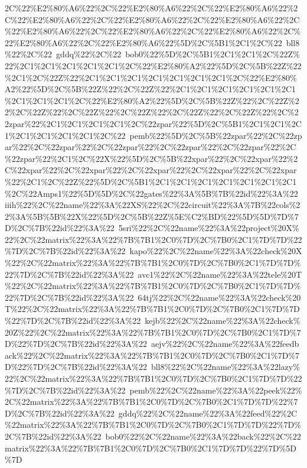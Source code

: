 \documentclass[onecolumn,unpublished,a4paper]{quantumarticle}
\theoremstyle{definition}
\begin{document}
2C\%22\%E2\%80\%A6\%22\%2C\%22\%E2\%80\%A6\%22\%2C\%22\%E2\%80\%A6\%22\%2C\%22\%E2\%80\%A6\%22\%2C\%22\%E2\%80\%A6\%22\%2C\%22\%E2\%80\%A6\%22\%2C\%22\%E2\%80\%A6\%22\%2C\%22\%E2\%80\%A6\%22\%2C\%22\%E2\%80\%A6\%22\%2C\%22\%E2\%80\%A6\%22\%2C\%22\%E2\%80\%A6\%22\%5D\%2C\%5B1\%2C1\%2C\%22~bll8\%22\%2C\%22~gddq\%22\%2C\%22~bob0\%22\%5D\%2C\%5B1\%2C1\%2C1\%2C\%22Z\%22\%2C1\%2C1\%2C1\%2C1\%2C1\%2C\%22\%E2\%80\%A2\%22\%5D\%2C\%5B\%22Z\%22\%2C1\%2C\%22Z\%22\%2C1\%2C1\%2C1\%2C1\%2C1\%2C1\%2C1\%2C\%22\%E2\%80\%A2\%22\%5D\%2C\%5B\%22Z\%22\%2C\%22Z\%22\%2C1\%2C1\%2C1\%2C1\%2C1\%2C1\%2C1\%2C1\%2C1\%2C\%22\%E2\%80\%A2\%22\%5D\%2C\%5B\%22Z\%22\%2C\%22Z\%22\%2C\%22Z\%22\%2C\%22Z\%22\%2C\%22Z\%22\%2C\%22Z\%22\%2C\%22Z\%22\%2C\%22zpar\%22\%2C1\%2C1\%2C1\%2C1\%2C\%22zpar\%22\%5D\%2C\%5B1\%2C1\%2C1\%2C1\%2C1\%2C1\%2C1\%2C1\%2C\%22~pemb\%22\%5D\%2C\%5B\%22zpar\%22\%2C\%22zpar\%22\%2C\%22zpar\%22\%2C\%22zpar\%22\%2C\%22zpar\%22\%2C\%22zpar\%22\%2C\%22zpar\%22\%2C1\%2C\%22X\%22\%5D\%2C\%5B\%22xpar\%22\%2C\%22xpar\%22\%2C\%22xpar\%22\%2C\%22xpar\%22\%2C\%22xpar\%22\%2C\%22xpar\%22\%2C\%22xpar\%22\%2C1\%2C\%22Z\%22\%5D\%2C\%5B1\%2C1\%2C1\%2C1\%2C1\%2C1\%2C1\%2C1\%2C\%22Amps1\%22\%5D\%5D\%2C\%22gates\%22\%3A\%5B\%7B\%22id\%22\%3A\%22~iiih\%22\%2C\%22name\%22\%3A\%22XS\%22\%2C\%22circuit\%22\%3A\%7B\%22cols\%22\%3A\%5B\%5B\%22X\%22\%5D\%2C\%5B\%22Z\%5E\%C2\%BD\%22\%5D\%5D\%7D\%7D\%2C\%7B\%22id\%22\%3A\%22~5sri\%22\%2C\%22name\%22\%3A\%22project\%20X\%22\%2C\%22matrix\%22\%3A\%22\%7B\%7B1\%2C0\%7D\%2C\%7B0\%2C1\%7D\%7D\%22\%7D\%2C\%7B\%22id\%22\%3A\%22~kapo\%22\%2C\%22name\%22\%3A\%22check\%20X\%22\%2C\%22matrix\%22\%3A\%22\%7B\%7B1\%2C0\%7D\%2C\%7B0\%2C1\%7D\%7D\%22\%7D\%2C\%7B\%22id\%22\%3A\%22~avc1\%22\%2C\%22name\%22\%3A\%22tele\%20T\%22\%2C\%22matrix\%22\%3A\%22\%7B\%7B1\%2C0\%7D\%2C\%7B0\%2C1\%7D\%7D\%22\%7D\%2C\%7B\%22id\%22\%3A\%22~64tj\%22\%2C\%22name\%22\%3A\%22check\%20T\%22\%2C\%22matrix\%22\%3A\%22\%7B\%7B1\%2C0\%7D\%2C\%7B0\%2C1\%7D\%7D\%22\%7D\%2C\%7B\%22id\%22\%3A\%22~kejb\%22\%2C\%22name\%22\%3A\%22check\%20Z\%22\%2C\%22matrix\%22\%3A\%22\%7B\%7B1\%2C0\%7D\%2C\%7B0\%2C1\%7D\%7D\%22\%7D\%2C\%7B\%22id\%22\%3A\%22~aejv\%22\%2C\%22name\%22\%3A\%22feedback\%22\%2C\%22matrix\%22\%3A\%22\%7B\%7B1\%2C0\%7D\%2C\%7B0\%2C1\%7D\%7D\%22\%7D\%2C\%7B\%22id\%22\%3A\%22~bll8\%22\%2C\%22name\%22\%3A\%22lazy\%22\%2C\%22matrix\%22\%3A\%22\%7B\%7B1\%2C0\%7D\%2C\%7B0\%2C1\%7D\%7D\%22\%7D\%2C\%7B\%22id\%22\%3A\%22~pemb\%22\%2C\%22name\%22\%3A\%22peek\%22\%2C\%22matrix\%22\%3A\%22\%7B\%7B1\%2C0\%7D\%2C\%7B0\%2C1\%7D\%7D\%22\%7D\%2C\%7B\%22id\%22\%3A\%22~gddq\%22\%2C\%22name\%22\%3A\%22feed\%22\%2C\%22matrix\%22\%3A\%22\%7B\%7B1\%2C0\%7D\%2C\%7B0\%2C1\%7D\%7D\%22\%7D\%2C\%7B\%22id\%22\%3A\%22~bob0\%22\%2C\%22name\%22\%3A\%22back\%22\%2C\%22matrix\%22\%3A\%22\%7B\%7B1\%2C0\%7D\%2C\%7B0\%2C1\%7D\%7D\%22\%7D\%5D\%7D
\end{document}
